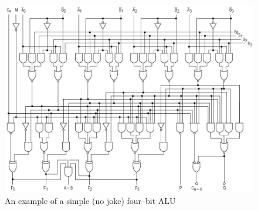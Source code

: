 \documentclass[12pt, dvipsnames, oneside, a4paper, titlepage, usenames]{report}
\begin{document}
    \begin{figure}
        \centering
        \includegraphics[width=\textwidth]{pictures/ALU.png}
        \caption*{An example of a simple (no joke) four--bit ALU}
    \end{figure}

    \printindex
\end{document}
